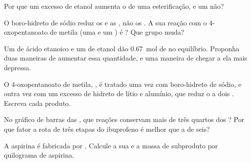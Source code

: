 \begin{exercise}[$\star$]\label{exo:g12:synthesis-strategy:4}
Por que um excesso de etanol aumenta o  de uma esterificação,
e um  não?
\end{exercise}

\begin{exercise}[$\star$]\label{exo:g12:synthesis-strategy:5}
O boro-hidreto de sódio reduz os  e as , não os .
A sua reação com o 4-oxopentanoato de metila (uma  e um ) é
? Que grupo muda?
\end{exercise}

\begin{exercise}[$\star\star$]\label{exo:g12:synthesis-strategy:6}
Um  de ácido etanoico e um de etanol dão \qty{0.67}{mol} de  no
equilíbrio. Proponha duas maneiras de aumentar essa quantidade, e uma
maneira de chegar a ela mais depressa.
\end{exercise}

\begin{exercise}[$\star\star$]\label{exo:g12:synthesis-strategy:7}
O 4-oxopentanoato de metila, , é tratado uma
vez com boro-hidreto de sódio, e outra vez com um excesso de hidreto de
lítio e alumínio, que reduz o  a dois . Escreva cada
produto.
\end{exercise}

\begin{exercise}[$\star\star$]\label{exo:g12:synthesis-strategy:8}
No gráfico de barras das , que reações conservam mais
de três quartos dos ? Por que fator a rota de três etapas do
ibuprofeno é melhor que a de seis?
\end{exercise}

\begin{exercise}[$\star\star$]\label{exo:g12:synthesis-strategy:9}
A aspirina é fabricada por .
Calcule a sua  e a massa de subproduto por quilograma de
aspirina.
\end{exercise}


